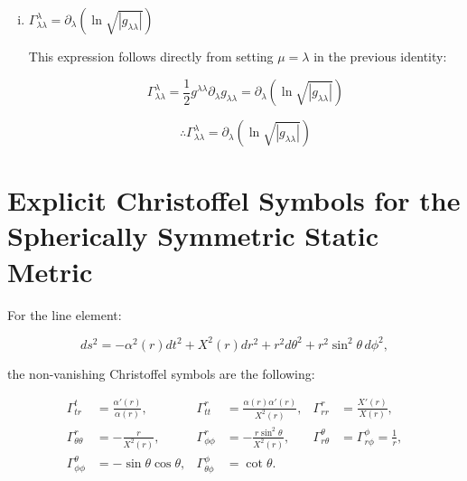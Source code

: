 \documentclass[12pt]{report}
\begin{document}
\begin{enumerate}[(i)]
		because $g_{\delta\lambda}=0$ for $\delta\neq\lambda$ and $g_{\mu\lambda}=0$ for $\mu\neq\lambda$. Then:
		
		\begin{equation}
			\Gamma^\lambda_{\mu\lambda} 
			= \frac{1}{2} g^{\lambda\lambda} \partial_\mu g_{\lambda\lambda}
			= \frac{1}{2} \frac{1}{g_{\lambda\lambda}} \partial_\mu g_{\lambda\lambda}
			= \partial_\mu(\ln\sqrt{|g_{\lambda\lambda}|})
		\end{equation}
		
		\begin{equation}
			\therefore \boxed{\Gamma^\lambda_{\mu\lambda} = \partial_\mu(\ln\sqrt{|g_{\lambda\lambda}|})}
		\end{equation}
		
		\item $\Gamma^{\lambda}_{\lambda\lambda} = \partial_{\lambda}(\ln\sqrt{|g_{\lambda\lambda}|})$
		
		This expression follows directly from setting $\mu = \lambda$ in the previous identity:
		
		\begin{equation}
			\Gamma^{\lambda}_{\lambda\lambda}
			= \frac{1}{2} g^{\lambda\lambda} \partial_{\lambda} g_{\lambda\lambda}
			= \partial_{\lambda}(\ln\sqrt{|g_{\lambda\lambda}|})
		\end{equation}
		
		\begin{equation}
			\therefore \boxed{\Gamma^{\lambda}_{\lambda\lambda} = \partial_{\lambda}(\ln\sqrt{|g_{\lambda\lambda}|})}
		\end{equation}
		
	\end{enumerate}
	
	\vspace{0.5cm}
	
	\section{Explicit Christoffel Symbols for the Spherically Symmetric Static Metric}
	
	For the line element:
	
	\begin{equation}
		ds^2 = -\alpha^2(r) dt^2 + X^2(r) dr^2 + r^2 d\theta^2 + r^2 \sin^2\theta\, d\phi^2,
	\end{equation}
	
	the non-vanishing Christoffel symbols are the following:
	
	\begin{align*}
		\Gamma^t_{tr} &= \frac{\alpha'(r)}{\alpha(r)}, 
		&\Gamma^r_{tt} &= \frac{\alpha(r)\alpha'(r)}{X^2(r)}, 
		&\Gamma^r_{rr} &= \frac{X'(r)}{X(r)}, \\
		\Gamma^r_{\theta\theta} &= -\frac{r}{X^2(r)}, 
		&\Gamma^r_{\phi\phi} &= -\frac{r\sin^2\theta}{X^2(r)}, 
		&\Gamma^\theta_{r\theta} &= \Gamma^\phi_{r\phi} = \frac{1}{r}, \\
		\Gamma^\theta_{\phi\phi} &= -\sin\theta\cos\theta, 
		&\Gamma^\phi_{\theta\phi} &= \cot\theta.
	\end{align*}
	
\end{document}
